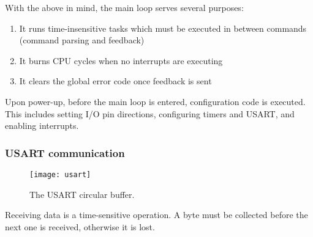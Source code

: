 With the above in mind, the main loop serves several purposes:
\begin{enumerate}
    \item It runs time-insensitive tasks which must be executed in between
    commands (command parsing and feedback)
    \item It burns CPU cycles when no interrupts are executing
    \item It clears the global error code once feedback is sent
\end{enumerate}

Upon power-up, before the main loop is entered, configuration code is executed.
This includes setting I/O pin directions, configuring timers and USART, and
enabling interrupts.

\subsubsection{USART communication}

\begin{figure}[ht]
    \begin{center}
        \texttt{[image: usart]}
        \caption{The USART circular buffer.}
        \label{firmware}
    \end{center}
\end{figure}

Receiving data is a time-sensitive operation. A byte must be collected before
the next one is received, otherwise it is lost.
